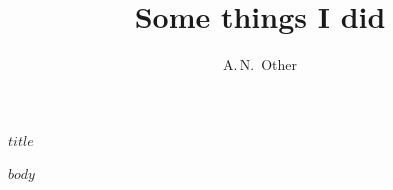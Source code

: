 \documentclass[a4paper]{article}
\author{A.\,N.~Other}
\title{Some things I did}
\begin{document}
\LARGE{$title$}

\normalsize 
$body$
\end{document}
